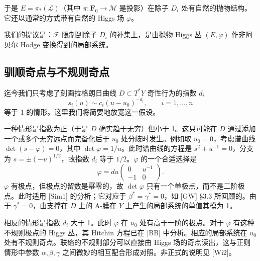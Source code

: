 \documentclass[11pt,a4paper]{article}
\begin{document}
于是 $E=\pi_*(\mathcal{L})$（其中 $\pi:\boldsymbol{F}_0\to\mathcal{M}$ 是投影）在除子 $D_i$ 处有自然的抛物结构。它还以通常的方式带有自然的 Higgs 场 $\varphi$。

我们的提议是：$\mathcal{F}$ 限制到除子 $D_i$ 的补集上，是由抛物 Higgs 丛 $(E,\varphi)$ 作非阿贝尔 Hodge 变换得到的局部系统。


\subsection{驯顺奇点与不规则奇点}

迄今我们只考虑了刻画拉格朗日曲线 $D\subset T^*Y$ 奇性行为的指数 $d_i$
\begin{equation}\tag{4.25}
s_i(u)\sim c_i(u-u_0)^{-d_i},\qquad i=1,\dots,n
\end{equation}
等于 1 的情形。这里我们将简要地放宽这一假设。

一种情形是指数为正（于是 $D$ 确实趋于无穷）但小于 1。这只可能在 $D$ 通过添加一个或多个无穷远点而完备化后于 $u_0$ 处分歧时发生。例如取 $u_0=0$，考虑谱曲线 $\det(s-\varphi)=0$，其中 $\det\varphi=1/u$。此时谱曲线的方程是 $s^2+u^{-1}=0$，分支为 $s=\pm(-u)^{1/2}$，故指数 $d_i$ 等于 $1/2$。$\varphi$ 的一个合适选择是
\begin{equation}\tag{4.26}
\varphi=du\begin{pmatrix}0&u^{-1}\\-1&0\end{pmatrix}.
\end{equation}
$\varphi$ 有极点，但极点的留数是幂零的，故 $\det\varphi$ 只有一个单极点，而不是二阶极点。此时适用 [Sim1] 的分析；它对应于 $\beta^*=\gamma^*=0$，如 [GW] §3.3 所回顾的。由于 $\gamma^*=0$，由支撑在 $D$ 上的 A-膜在 $Y$ 上产生的局部系统的单值其模为 1。

相反的情形是指数 $d_i$ 大于 1。此时 $\varphi$ 在 $u_0$ 处有高于一阶的极点。对于 $\varphi$ 有这种不规则极点的 Higgs 丛，其 Hitchin 方程已在 [BB] 中分析。相应的局部系统在 $u_0$ 处有不规则奇点。联络的不规则部分可以直接由 Higgs 场的奇点读出，这与正则情形中参数 $\alpha,\beta,\gamma$ 之间微妙的相互配合形成对照。非正式的说明见 [Wi2]。
\end{document}
